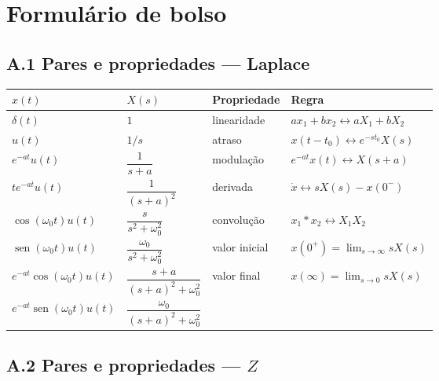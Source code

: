 \section{Formulário de bolso}\label{ap:form}

\subsection*{A.1 Pares e propriedades --- Laplace}

\begin{center}
\begin{tabular}{ll@{\qquad}ll}
\toprule
$x(t)$ & $X(s)$ & Propriedade & Regra\\
\midrule
$\delta(t)$ & $1$ & linearidade & $ax_1+bx_2\leftrightarrow aX_1+bX_2$\\
$u(t)$ & $1/s$ & atraso & $x(t-t_0)\leftrightarrow e^{-st_0}X(s)$\\
$e^{-at}u(t)$ & $\dfrac{1}{s+a}$ & modulação & $e^{-at}x(t)\leftrightarrow X(s+a)$\\
$te^{-at}u(t)$ & $\dfrac{1}{(s+a)^2}$ & derivada & $\dot x\leftrightarrow sX(s)-x(0^-)$\\
$\cos(\omega_0t)u(t)$ & $\dfrac{s}{s^2+\omega_0^2}$ & convolução & $x_1*x_2\leftrightarrow X_1X_2$\\
$\operatorname{sen}(\omega_0t)u(t)$ & $\dfrac{\omega_0}{s^2+\omega_0^2}$ & valor inicial & $x(0^+)=\lim_{s\to\infty}sX(s)$\\
$e^{-at}\cos(\omega_0t)u(t)$ & $\dfrac{s+a}{(s+a)^2+\omega_0^2}$ & valor final & $x(\infty)=\lim_{s\to0}sX(s)$\\
$e^{-at}\operatorname{sen}(\omega_0t)u(t)$ & $\dfrac{\omega_0}{(s+a)^2+\omega_0^2}$ & & \\
\bottomrule
\end{tabular}
\end{center}

\subsection*{A.2 Pares e propriedades --- $Z$}

